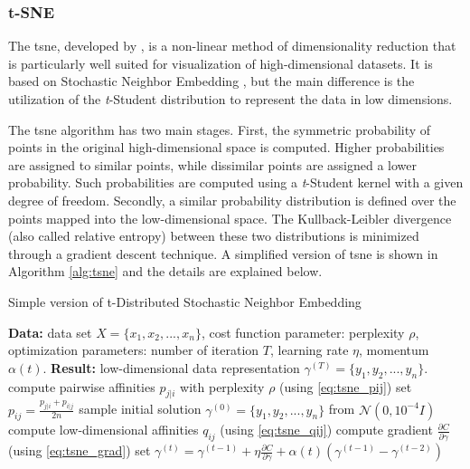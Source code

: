 \subsubsection{t-SNE}

The \acf{tsne}, developed by \cite{tsne}, is a non-linear method of dimensionality reduction that is particularly well suited for visualization of high-dimensional datasets. It is based on Stochastic Neighbor Embedding \citep{sne}, but the main difference is the utilization of the \textit{t}-Student distribution to represent the data in low dimensions.

The \acs{tsne} algorithm has two main stages. First, the symmetric probability of points in the original high-dimensional space is computed. Higher probabilities are assigned to similar points, while dissimilar points are assigned a lower probability. Such probabilities are computed using a \textit{t}-Student kernel with a given degree of freedom. Secondly, a similar probability distribution is defined over the points mapped into the low-dimensional space. The Kullback-Leibler divergence (also called relative entropy) between these two distributions is minimized through a gradient descent technique. A simplified version of \acs{tsne} is shown in Algorithm \ref{alg:tsne} and the details are explained below.

\begin{algorithm}[t]
\caption{Simple version of t-Distributed Stochastic Neighbor Embedding}
\label{alg:tsne}
\begin{algorithmic}
    \State \textbf{Data:} data set $X = \{x_1, x_2, ..., x_n\}$,
    \State cost function parameter: perplexity $\rho$,
    \State optimization parameters: number of iteration $T$, learning rate $\eta$, momentum $\alpha(t)$.
    \State \textbf{Result:} low-dimensional data representation $\gamma^{(T)} = \{y_1, y_2, ..., y_n\}$.
    \Begin 
        \State compute pairwise affinities $p_{j|i}$ with perplexity $\rho$ (using \autoref{eq:tsne_pij})
        \State set $p_{ij} = \frac{p_{j|i} + p_{i|j}}{2n}$
        \State sample initial solution $\gamma^{(0)} = \{y_1, y_2, ..., y_n\}$ from $\mathcal{N}(0, 10^{-4}I)$
        \Begin
            \State compute low-dimensional affinities $q_{ij}$ (using \autoref{eq:tsne_qij})
            \State compute gradient $\frac{\partial C}{\partial \gamma}$ (using \autoref{eq:tsne_grad})
            \State set $\gamma^{(t)} = \gamma^{(t-1)} + \eta \frac{\partial C}{\partial \gamma} + \alpha(t)(\gamma^{(t-1)} - \gamma^{(t-2)})$
        \End
    \End
\end{algorithmic}
\end{algorithm}

